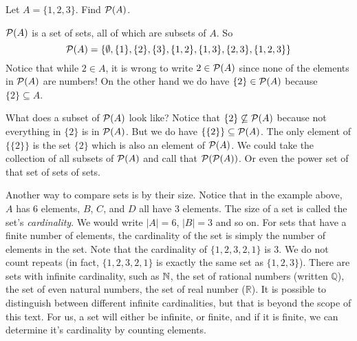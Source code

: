 \documentclass[12pt]{article}
\begin{document}
\begin{example}
  Let $A = \{1,2,3\}$.  Find $\mathcal P(A)$.
  \begin{solution}
    $\mathcal P(A)$ is a set of sets, all of which are subsets of $A$.  So
    \[\mathcal P(A) = \{ \emptyset, \{1\}, \{2\}, \{3\}, \{1,2\}, \{1, 3\}, \{2,3\}, \{1,2,3\}\}\]
    Notice that while $2 \in A$, it is wrong to write $2 \in \mathcal P(A)$ since none of the elements in $\mathcal P(A)$ are numbers!  On the other hand we do have $\{2\} \in \mathcal P(A)$ because $\{2\} \subseteq A$.  
    
    What does a subset of $\mathcal P(A)$ look like?  Notice that $\{2\} \not\subseteq \mathcal P(A)$ because not everything in $\{2\}$ is in $\mathcal P(A)$.  But we do have $\{ \{2\} \} \subseteq \mathcal P(A)$.  The only element of $\{\{2\}\}$ is the set $\{2\}$ which is also an element of $\mathcal P(A)$.  We could take the collection of all subsets of $\mathcal P(A)$ and call that $\mathcal P(\mathcal P(A))$.  Or even the power set of that set of sets of sets. 
  \end{solution}

\end{example}


Another way to compare sets is by their size.  Notice that in the example above, $A$ has 6 elements, $B$, $C$, and $D$ all have 3 elements.  The size of a set is called the set's \emph{cardinality}.  We would write $|A| = 6$, $|B| = 3$ and so on.  For sets that have a finite number of elements, the cardinality of the set is simply the number of elements in the set.  Note that the cardinality of $\{ 1, 2, 3, 2, 1\}$ is 3. We do not count repeats (in fact, $\{1, 2, 3, 2, 1\}$ is exactly the same set as $\{1, 2, 3\}$).  There are sets with infinite cardinality, such as $\mathbb N$, the set of rational numbers (written $\mathbb Q$), the set of even natural numbers, the set of real number ($\mathbb R$).  It is possible to distinguish between different infinite cardinalities, but that is beyond the scope of this text.  For us, a set will either be infinite, or finite, and if it is finite, we can determine it's cardinality by counting elements.
\end{document}
